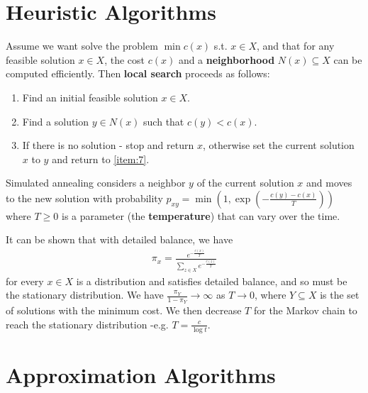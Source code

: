 \section{Heuristic Algorithms}
\label{sec:heuristic-algorithms}

\begin{defn}
  \label{sec:heuristic-algorithms-1}
  Assume we want solve the problem $\min c(x)$ s.t. $x \in X$, and
  that for any feasible solution $x \in X$, the cost $c(x)$ and a
  \textbf{neighborhood} $N(x) \subseteq X$ can be computed
  efficiently.  Then \textbf{local search} proceeds as follows:
  \begin{enumerate}
  \item Find an initial feasible solution $x \in X$.
  \item\label{item:7} Find a solution $y \in N(x)$ such that $c(y) < c(x)$.
  \item If there is no solution - stop and return $x$, otherwise set
    the current solution $x$ to $y$ and return to \ref{item:7}.
  \end{enumerate}
\end{defn}

\begin{defn}
  \label{sec:heuristic-algorithms-2}
  Simulated annealing considers a neighbor $y$ of the current
  solution $x$ and moves to the new solution with probability $p_{xy}
  = \min(1, \exp(-\frac{c(y) - c(x)}{T}))$ where $T \geq 0$ is a
  parameter (the \textbf{temperature}) that can vary over the time.

  It can be shown that with detailed balance, we have
  \begin{align}
    \label{eq:14}
    \pi_{x} = \frac{e^{-\frac{c(x)}{T}}}{\sum_{z \in X}^{} e^{-\frac{c(z)}{T}}} 
  \end{align} for every $x \in X$ is a distribution and satisfies
  detailed balance, and so must be the stationary distribution.
  We have $\frac{\pi_{Y}}{1 - \pi_{Y}} \rightarrow \infty$ as $T
  \rightarrow 0$, where $Y \subseteq X$ is the set of solutions with
  the minimum cost. We then decrease $T$ for the Markov chain to reach
  the stationary distribution -e.g. $T = \frac{c}{\log t}$.
\end{defn}

\section{Approximation Algorithms}
\label{sec:appr-algor}


